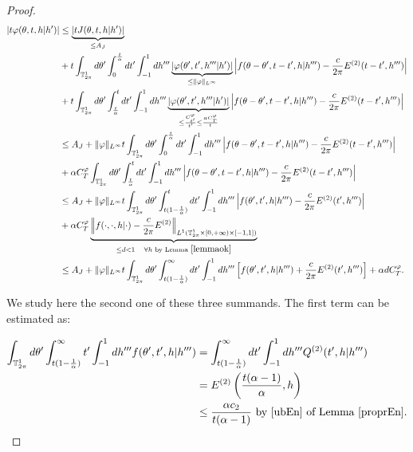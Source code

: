 \documentclass[a4paper,10pt,reqno]{amsart}
\numberwithin{equation}{subsection}
\numberwithin{figure}{subsection}
\begin{document}
\begin{proof}
{\tiny\begin{align*}
|t\varphi(\theta,t,h|h')|&\leq\underbrace{|tJ(\theta,t,h|h')|}_{\leq A_J}
\\
&+t\int_{\mathbb{T}^1_{2\pi}}d\theta'\int_0^{\frac{t}{\alpha}}dt'\int_{-1}^1dh'''\underbrace{|\varphi(\theta',t',h'''|h')|}_{\leq \|\varphi\|_{L^{\infty}}}\left|f(\theta-\theta',t-t',h|h''')-\frac{c}{2\pi}E^{(2)}(t-t',h''')\right|
\\
&+t\int_{\mathbb{T}^1_{2\pi}}d\theta'\int_{\frac{t}{\alpha}}^tdt'\int_{-1}^1dh'''\underbrace{|\varphi(\theta',t',h'''|h')|}_{\leq \frac{C_{t'}^{\varphi}}{t'}\leq \frac{\alpha C_T^{\varphi}}{t}}\left|f(\theta-\theta',t-t',h|h''')-\frac{c}{2\pi}E^{(2)}(t-t',h''')\right|
\\
&\leq A_J+\|\varphi\|_{L^{\infty}}t\int_{\mathbb{T}^1_{2\pi}}d\theta'\int_0^{\frac{t}{\alpha}}dt'\int_{-1}^1dh'''\left|f(\theta-\theta',t-t',h|h''')-\frac{c}{2\pi}E^{(2)}(t-t',h''')\right|
\\
&+\alpha C_T^{\varphi}\int_{\mathbb{T}^1_{2\pi}}d\theta'\int_{\frac{t}{\alpha}}^tdt'\int_{-1}^1dh'''\left|f(\theta-\theta',t-t',h|h''')-\frac{c}{2\pi}E^{(2)}(t-t',h''')\right|
\\
&\leq A_J+\|\varphi\|_{L^{\infty}}t\int_{\mathbb{T}^1_{2\pi}}d\theta'\int_{t(1-\frac{1}{\alpha})}^tdt'\int_{-1}^1dh'''\left|f(\theta',t',h|h''')-\frac{c}{2\pi}E^{(2)}(t',h''')\right|
\\
&+\alpha C_T^{\varphi}\underbrace{\left\|f(\cdot,\cdot,h|\cdot)-\frac{c}{2\pi}E^{(2)}\right\|_{L^1(\mathbb{T}^1_{2\pi}\times[0,+\infty)\times[-1,1])}}_{\leq d<1\quad\forall h\textrm{ by Lemma }\ref{lemmaok}}
\\
&\leq A_J+\|\varphi\|_{L^{\infty}}t\int_{\mathbb{T}^1_{2\pi}}d\theta'\int_{t(1-\frac{1}{\alpha})}^{\infty}dt'\int_{-1}^1dh'''\left[f(\theta',t',h|h''')+\frac{c}{2\pi}E^{(2)}(t',h''')\right]+\alpha dC_T^{\varphi}.
\end{align*}}

We study here the second one of these three summands. The first term can be estimated as:

\begin{align*}
\int_{\mathbb{T}^1_{2\pi}}d\theta'\int_{t(1-\frac{1}{\alpha})}^{\infty}t'\int_{-1}^1dh'''f(\theta',t',h|h''')&=\int_{t(1-\frac{1}{\alpha})}^{\infty}dt'\int_{-1}^1dh'''Q^{(2)}(t',h|h''')
\\
&=E^{(2)}\left(\frac{t(\alpha-1)}{\alpha},h\right)
\\
&\leq\frac{\alpha c_2}{t(\alpha-1)}\textrm{ by }\eqref{ubEn}\textrm{ of Lemma \ref{proprEn}}.
\end{align*}


\end{proof}
\end{document}
